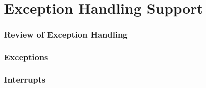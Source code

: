 \section{Exception Handling Support}

\begin{frame}
    \frametitle{Review of Exception Handling}
\end{frame}

\begin{frame}
    \frametitle{Exceptions}
\end{frame}

\begin{frame}
    \frametitle{Interrupts}
\end{frame}
